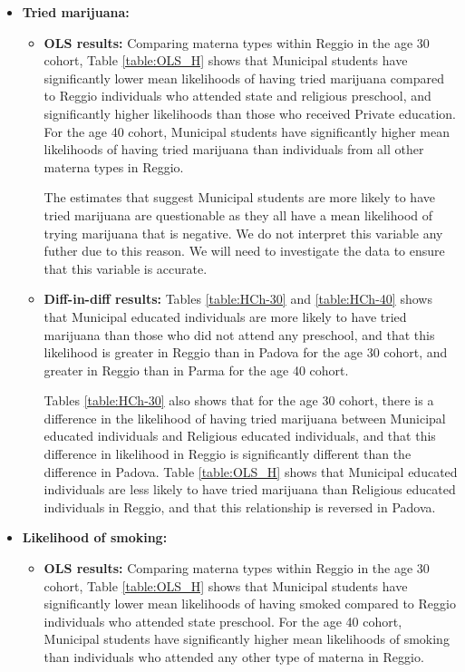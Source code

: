 \documentclass[11pt]{article}
\begin{document}
\begin{itemize}
\item \textbf{Tried marijuana:} 
	
	\begin{itemize}
	\item \textbf{OLS results:} Comparing materna types within Reggio in the age 30 cohort, Table \ref{table:OLS_H} shows that Municipal students have significantly lower mean likelihoods of having tried marijuana compared to Reggio individuals who attended state and religious preschool, and significantly higher likelihoods than those who received Private education. For the age 40 cohort,  Municipal students have significantly higher mean likelihoods of having tried marijuana than individuals from all other materna types in Reggio. 

The estimates that suggest Municipal students are more likely to have tried marijuana are questionable as they all have a mean likelihood of trying marijuana that is negative. We do not interpret this variable any futher due to this reason. We will need to investigate the data to ensure that this variable is accurate.
		
	\item \textbf{Diff-in-diff results:} Tables  \ref{table:HCh-30} and  \ref{table:HCh-40} shows that Municipal educated individuals are more likely to have tried marijuana than those who did not attend any preschool, and that this likelihood is greater in Reggio than in Padova for the age 30 cohort, and greater in Reggio than in Parma for the age 40 cohort.
	
	Tables  \ref{table:HCh-30} also shows that for the age 30 cohort, there is a difference in the likelihood of having tried marijuana between Municipal educated individuals and Religious educated individuals, and that this difference in likelihood in Reggio is significantly different than the difference in Padova. Table \ref{table:OLS_H} shows that Municipal educated individuals are less likely to have tried marijuana than Religious educated individuals in Reggio, and that this relationship is reversed in Padova.
	\end{itemize}


\item \textbf{Likelihood of smoking:} 
	
	\begin{itemize}
	\item \textbf{OLS results:} Comparing materna types within Reggio in the age 30 cohort, Table \ref{table:OLS_H} shows that Municipal students have significantly lower mean likelihoods of having smoked compared to Reggio individuals who attended state preschool. For the age 40 cohort,  Municipal students have significantly higher mean likelihoods of smoking than individuals who attended any other type of materna in Reggio.


\end{itemize}
\end{itemize}
\end{document}
